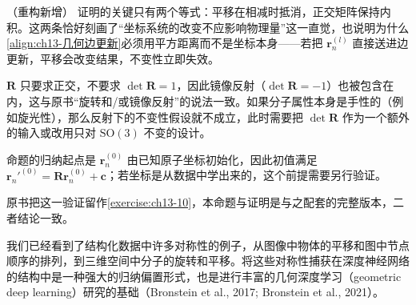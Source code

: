\documentclass[../../main.tex]{subfiles}
\begin{document}
\begin{remark}（重构新增）
证明的关键只有两个等式：平移在相减时抵消，正交矩阵保持内积。这两条恰好刻画了“坐标系统的改变不应影响物理量”这一直觉，也说明为什么\eqref{align:ch13-几何边更新}必须用平方距离而不是坐标本身——若把 $\bm{r}_n^{(l)}$ 直接送进边更新，平移会改变结果，不变性立即失效。\par
$\bm{R}$ 只要求正交，不要求 $\det\bm{R}=1$，因此镜像反射（$\det\bm{R}=-1$）也被包含在内，这与原书“旋转和/或镜像反射”的说法一致。如果分子属性本身是手性的（例如旋光性），那么反射下的不变性假设就不成立，此时需要把 $\det\bm{R}$ 作为一个额外的输入或改用只对 $\mathrm{SO}(3)$ 不变的设计。\par
命题的归纳起点是 $\bm{r}_n^{(0)}$ 由已知原子坐标初始化，因此初值满足 $\bm{r}_n'^{(0)}=\bm{R}\bm{r}_n^{(0)}+\bm{c}$；若坐标是从数据中学出来的，这个前提需要另行验证。\par
原书把这一验证留作\cref{exercise:ch13-10}，本命题与证明是与之配套的完整版本，二者结论一致。
\end{remark}

我们已经看到了结构化数据中许多对称性的例子，从图像中物体的平移和图中节点顺序的排列，到三维空间中分子的旋转和平移。将这些对称性捕获在深度神经网络的结构中是一种强大的归纳偏置形式，也是进行丰富的几何深度学习（geometric deep learning）研究的基础（Bronstein et al., 2017; Bronstein et al., 2021）。
\end{document}
